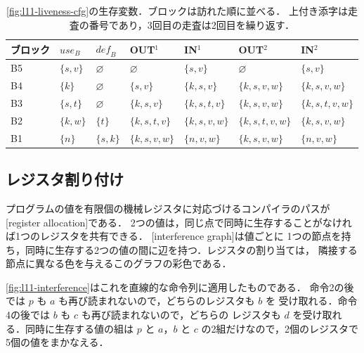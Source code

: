 \documentclass[../main.tex]{subfiles}
\begin{document}
\begin{table}[tb]
  \centering\small
  \setlength{\tabcolsep}{4pt}
  \begin{tabular}{@{}lllllll@{}}
    \toprule
    ブロック & $\mathit{use}_B$ & $\mathit{def}_B$ & OUT$^1$ & IN$^1$ & OUT$^2$ & IN$^2$ \\
    \midrule
    B5 & $\{s,v\}$ & $\varnothing$ & $\varnothing$ & $\{s,v\}$ & $\varnothing$ & $\{s,v\}$ \\
    B4 & $\{k\}$ & $\varnothing$ & $\{s,v\}$ & $\{k,s,v\}$ & $\{k,s,v,w\}$ & $\{k,s,v,w\}$ \\
    B3 & $\{s,t\}$ & $\varnothing$ & $\{k,s,v\}$ & $\{k,s,t,v\}$ & $\{k,s,v,w\}$ & $\{k,s,t,v,w\}$ \\
    B2 & $\{k,w\}$ & $\{t\}$ & $\{k,s,t,v\}$ & $\{k,s,v,w\}$ & $\{k,s,t,v,w\}$ & $\{k,s,v,w\}$ \\
    B1 & $\{n\}$ & $\{s,k\}$ & $\{k,s,v,w\}$ & $\{n,v,w\}$ & $\{k,s,v,w\}$ & $\{n,v,w\}$ \\
    \bottomrule
  \end{tabular}
  \caption{\cref{fig:l11-liveness-cfg}の生存変数．ブロックは訪れた順に並べる．
    上付き添字は走査の番号であり，3回目の走査は2回目を繰り返す．}
  \label{tab:l11-liveness}
\end{table}

\subsection{レジスタ割り付け}
\label{sec:l11-regalloc}

\begin{definition}[レジスタ割り付け]
  \label{def:l11-regalloc}
  プログラムの値を有限個の機械レジスタに対応づけるコンパイラのパスが
  [register allocation]である．
  2つの値は，同じ点で同時に生存することがなければ1つのレジスタを共有できる．
  [interference graph]は値ごとに
  1つの節点を持ち，同時に生存する2つの値の間に辺を持つ．レジスタの割り当ては，
  隣接する節点に異なる色を与えるこのグラフの彩色である．
\end{definition}

%
\cref{fig:l11-interference}はこれを直線的な命令列に適用したものである．
命令2の後では $p$ も $a$ も再び読まれないので，どちらのレジスタも $b$ を
受け取れる．命令4の後では $b$ も $c$ も再び読まれないので，どちらの
レジスタも $d$ を受け取れる．同時に生存する値の組は $p$ と $a$，$b$ と
$c$ の2組だけなので，2個のレジスタで5個の値をまかなえる．
\end{document}
